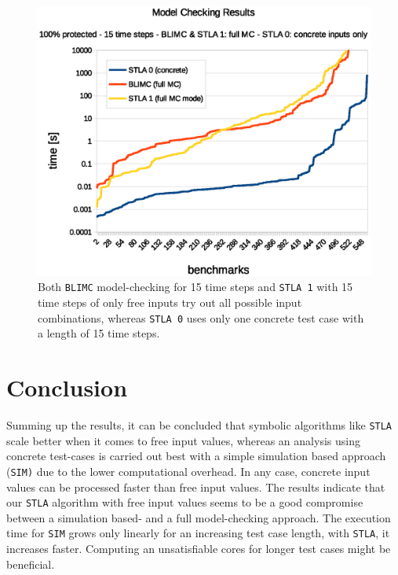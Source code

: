 \documentclass[a4paper,10pt]{article}
\begin{document}
\begin{figure}[!htb]
\centering
\includegraphics[scale = 0.64]{img/mc.eps}
\centering \caption{Both \texttt{BLIMC} model-checking for 15 time steps and \texttt{STLA 1} with 15 time steps of only free inputs try out all possible input combinations, 
whereas \texttt{STLA 0} uses only one concrete test case with a length of 15 time steps. } 
\label{mc-chart}
\end{figure}

\newpage
\section{Conclusion}
Summing up the results, it can be concluded that symbolic algorithms like \texttt{STLA} scale better when it comes to free input values, whereas an analysis using concrete test-cases is carried out best with 
a simple simulation based approach (\texttt{SIM)} due to the lower computational overhead. In any case, concrete input values can be processed faster than free input values.
The results indicate that our \texttt{STLA} algorithm with free input values seems to be a good compromise between a simulation based- and a full model-checking approach.
The execution time for \texttt{SIM} grows only linearly for an increasing test case length, with \texttt{STLA}, it increases faster. Computing an unsatisfiable cores for longer test cases might be beneficial.
\end{document}
